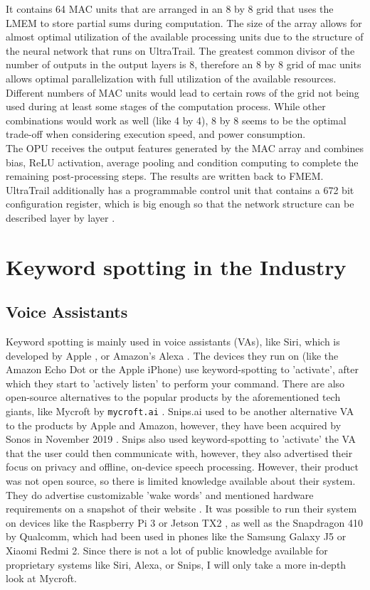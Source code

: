 It contains 64 MAC units that are arranged in an 8 by 8 grid that uses the LMEM to store partial sums during computation.
The size of the array allows for almost optimal utilization of the available processing units due to the structure of the
neural network that runs on UltraTrail.
The greatest common divisor of the number of outputs in the output layers is 8, therefore an 8 by 8 grid of mac units
allows optimal parallelization with full utilization of the available resources.
Different numbers of MAC units would lead to certain rows of the grid not being used during at least some stages of the
computation process.
While other combinations would work as well (like 4 by 4), 8 by 8 seems to be the optimal trade-off when
considering execution speed, and power consumption.
\\
The OPU receives the output features generated by the MAC array and combines bias, ReLU activation,
average pooling and condition computing to complete the remaining post-processing steps.
The results are written back to FMEM.
\\
UltraTrail additionally has a programmable control unit that contains a 672 bit
configuration register, which is big enough so that the network structure
can be described layer by layer \cite[Ch IV]{ultratrail}.

\newpage
\section{Keyword spotting in the Industry}

\subsection{Voice Assistants}

Keyword spotting is mainly used in voice assistants (VAs), like Siri, which is developed by Apple \cite{siri}, or Amazon's Alexa \cite{alexa}.
The devices they run on (like the Amazon Echo Dot or the Apple iPhone) use keyword-spotting to 'activate', after which they start
to 'actively listen' to perform your command.
There are also open-source alternatives to the popular products by the aforementioned tech giants, like Mycroft by \lstinline{mycroft.ai} \cite{mycroft}.
Snips.ai used to be another alternative VA to the products by Apple and Amazon, however, they have been acquired by Sonos in November 2019 \cite{sonos_snips}.
Snips also used keyword-spotting to 'activate' the VA that the user could then communicate with, however, they also advertised their focus
on privacy and offline, on-device speech processing.
However, their product was not open source, so there is limited knowledge available about their system.
They do advertise customizable 'wake words' and mentioned hardware requirements on a snapshot of their website \cite{snips_flow}.
It was possible to run their system on devices like the Raspberry Pi 3 \cite{rpi3} or Jetson TX2 \cite{jetson_tx2},
as well as the Snapdragon 410 \cite{snapdragon_410} by Qualcomm, which had been used in phones like the Samsung Galaxy J5 or Xiaomi Redmi 2.
Since there is not a lot of public knowledge available for proprietary systems like Siri, Alexa, or Snips, I will only take a more in-depth look at Mycroft.

